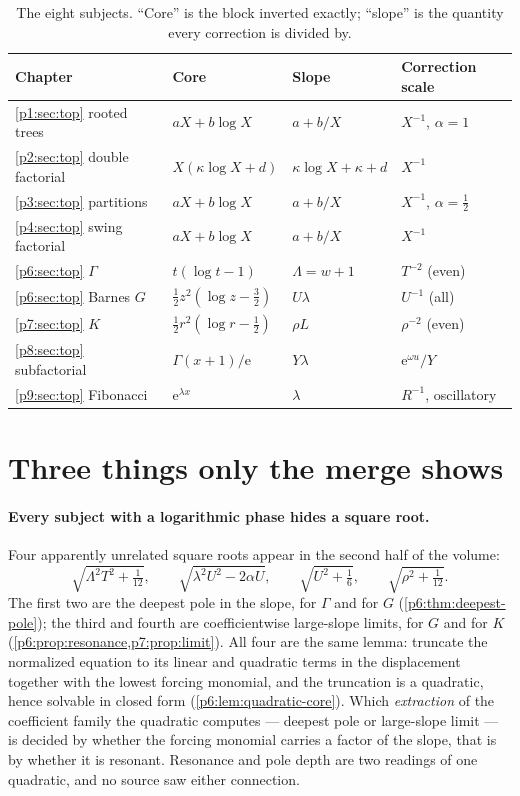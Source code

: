 \documentclass[11pt,a4paper,oneside]{book}
\theoremstyle{plain}
\theoremstyle{definition}
\theoremstyle{remark}
\newcommand{\e}{\mathrm{e}}
\begin{document}
\begin{table}[htbp]
\centering
\caption{The eight subjects.  ``Core'' is the block inverted exactly;
``slope'' is the quantity every correction is divided by.}
\label{p5:tab:eight}
\small
\setlength{\tabcolsep}{4pt}
\begin{tabular}{@{}llll@{}}
\toprule
Chapter & Core & Slope & Correction scale\\
\midrule
\ref{p1:sec:top} rooted trees & $aX+b\log X$ & $a+b/X$ & $X^{-1}$, $\alpha=1$\\
\ref{p2:sec:top} double factorial & $X(\kappa\log X+d)$ & $\kappa\log X+\kappa+d$ & $X^{-1}$\\
\ref{p3:sec:top} partitions & $aX+b\log X$ & $a+b/X$ & $X^{-1}$, $\alpha=\tfrac12$\\
\ref{p4:sec:top} swing factorial & $aX+b\log X$ & $a+b/X$ & $X^{-1}$\\
\addlinespace
\ref{p6:sec:top} $\Gamma$ & $t(\log t-1)$ & $\Lambda=w+1$ & $T^{-2}$ (even)\\
\ref{p6:sec:top} Barnes $G$ & $\tfrac12z^{2}(\log z-\tfrac32)$ & $U\lambda$ & $U^{-1}$ (all)\\
\ref{p7:sec:top} $K$ & $\tfrac12r^{2}(\log r-\tfrac12)$ & $\rho L$ & $\rho^{-2}$ (even)\\
\addlinespace
\ref{p8:sec:top} subfactorial & $\Gamma(x+1)/\e$ & $Y\lambda$ & $\e^{\omega u}/Y$\\
\ref{p9:sec:top} Fibonacci & $\e^{\lambda x}$ & $\lambda$ & $R^{-1}$, oscillatory\\
\bottomrule
\end{tabular}
\end{table}

\section{Three things only the merge shows}
\label{p5:sec:merge-only}

\paragraph{Every subject with a logarithmic phase hides a square root.}
Four apparently unrelated square roots appear in the second half of the
volume:
\[
 \sqrt{\Lambda^{2}T^{2}+\tfrac1{12}},
 \qquad
 \sqrt{\lambda^{2}U^{2}-2\alpha U},
 \qquad
 \sqrt{U^{2}+\tfrac16},
 \qquad
 \sqrt{\rho^{2}+\tfrac1{12}} .
\]
The first two are the deepest pole in the slope, for $\Gamma$ and for $G$
(\cref{p6:thm:deepest-pole}); the third and fourth are coefficientwise
large-slope limits, for $G$ and for $K$
(\cref{p6:prop:resonance,p7:prop:limit}).  All four are the same lemma:
truncate the normalized equation to its linear and quadratic terms in the
displacement together with the lowest forcing monomial, and the truncation is
a quadratic, hence solvable in closed form
(\cref{p6:lem:quadratic-core}).  Which \emph{extraction} of the coefficient
family the quadratic computes --- deepest pole or large-slope limit --- is
decided by whether the forcing monomial carries a factor of the slope, that
is by whether it is resonant.  Resonance and pole depth are two readings of
one quadratic, and no source saw either connection.
\end{document}
